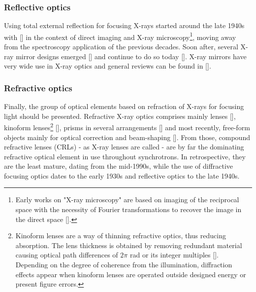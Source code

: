 \begin{refsection}
\subsubsection*{Reflective optics}

Using total external reflection for focusing X-rays started around the late 1940s with [\cite{Ehrenberg1947, Kirkpatrick1948, Ehrenberg1949, Kirkpatrick1950}] in the context of direct imaging and X-ray microscopy\footnote{Early works on "X-ray microscopy" are based on imaging of the reciprocal space with the necessity of Fourier transformations to recover the image in the direct space [\cite{Bragg1939,Bragg1942}].}, moving away from the spectroscopy application of the previous decades. Soon after, several X-ray mirror designs emerged [\cite{Wolter1952,Montel1957}] and continue to do so today [\cite{Matsuyama2017,Yamada2019,Yamada2020}]. X-ray mirrors have very wide use in X-ray optics and general reviews can be found in [\cite{Howells1993,Susini1993}].

\subsubsection*{Refractive optics}

Finally, the group of optical elements based on refraction of X-rays for focusing light should be presented. Refractive X-ray optics comprises mainly lenses [\cite{Snigirev1996}], kinoform lenses\footnote{Kinoform lenses are a way of thinning refractive optics, thus reducing absorption. The lens thickness is obtained by removing redundant material causing optical path differences of $2\pi$ rad or its integer multiples [\cite{Jordan1970,Ognev2005}]. Depending on the degree of coherence from the illumination, diffraction effects appear when kinoform lenses are operated outside designed energy or present figure errors.} [\cite{Snigireva2001,Snigireva2001a,David2004}], prisms in several arrangements [\cite{Cederstrom2000, Jark2004}] and most recently, free-form objects mainly for optical correction and beam-shaping [\cite{Seiboth2017, Zverev2017, Markus2018, Seiboth2019, Seiboth2020, Dhamgaye2020}]. From those, compound refractive lenses (CRLs) - as X-ray lenses are called - are by far the dominating refractive optical element in use throughout synchrotrons. In retrospective, they are the least mature, dating from the mid-1990s, while the use of diffractive focusing optics dates to the early 1930s and reflective optics to the late 1940s. 



\end{refsection}
